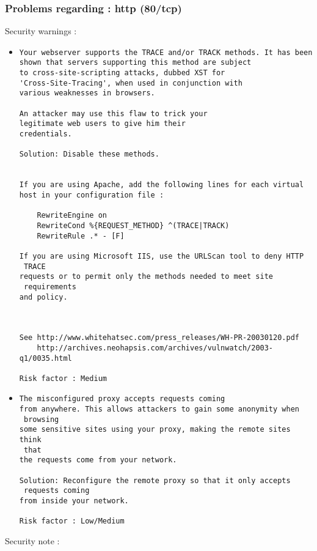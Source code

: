 \documentclass{article}
\begin{document}
\subsubsection{Problems regarding : http (80/tcp)}
Security warnings :\\
\begin{itemize}
\item \begin{verbatim}
Your webserver supports the TRACE and/or TRACK methods. It has been
shown that servers supporting this method are subject
to cross-site-scripting attacks, dubbed XST for
'Cross-Site-Tracing', when used in conjunction with
various weaknesses in browsers.

An attacker may use this flaw to trick your
legitimate web users to give him their 
credentials.

Solution: Disable these methods.


If you are using Apache, add the following lines for each virtual
host in your configuration file :

    RewriteEngine on
    RewriteCond %{REQUEST_METHOD} ^(TRACE|TRACK)
    RewriteRule .* - [F]

If you are using Microsoft IIS, use the URLScan tool to deny HTTP
 TRACE
requests or to permit only the methods needed to meet site
 requirements
and policy.



See http://www.whitehatsec.com/press_releases/WH-PR-20030120.pdf
    http://archives.neohapsis.com/archives/vulnwatch/2003-q1/0035.html

Risk factor : Medium
\end{verbatim}\item \begin{verbatim}
The misconfigured proxy accepts requests coming
from anywhere. This allows attackers to gain some anonymity when
 browsing 
some sensitive sites using your proxy, making the remote sites think
 that
the requests come from your network.

Solution: Reconfigure the remote proxy so that it only accepts
 requests coming 
from inside your network.
 
Risk factor : Low/Medium
\end{verbatim}\end{itemize}
Security note :\\
\end{document}
